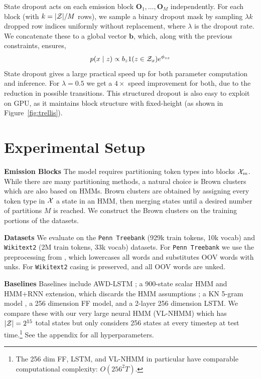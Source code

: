 \documentclass[11pt,a4paper]{article}
\begin{document}
State dropout acts on each emission block $\mathbf{O}_1, \ldots, \mathbf{O}_M$ independently.
For each block (with $k=|{\cal Z}| / M$ rows), we sample a binary dropout mask by sampling
$ \lambda k$ dropped row indices uniformly without replacement,
where $\lambda$ is the dropout rate.
We concatenate these to a global vector $\mathbf{b}$, which, along with the previous constraints, 
ensures,
\begin{equation}
\label{eqn:state_dropout}
p(x \mid z) \propto b_{z}1(z \in \mathcal{Z}_x)e^{\phi_{zx}}
\end{equation}
State dropout gives a large practical speed up for both parameter computation and inference.
For $\lambda=0.5$ we get a $4\times$ speed improvement for both,
due to the reduction in possible transitions.
This structured dropout is also easy to exploit on GPU,
as it maintains block structure with fixed-height (as shown in Figure~\ref{fig:trellis}).


\section{Experimental Setup}
\label{sec:experiments}

\textbf{Emission Blocks}
The model requires partitioning token types into blocks $\mathcal{X}_m$. 
While there are many partitioning methods, a natural choice
is Brown clusters \citep{brown1992,liang2005brown} which are also based on HMMs.
Brown clusters are obtained by assigning every token type in $\mathcal{X}$ a state in an HMM,
then merging states until a desired number of partitions $M$ is reached.
We construct the Brown clusters on the training portions of the datasets.

\noindent \textbf{Datasets}
We evaluate on the \texttt{Penn Treebank} \citep{ptb} (929k train tokens, 10k vocab)
and \texttt{Wikitext2} \citep{wikitext} (2M train tokens, 33k vocab) datasets.
For \texttt{Penn Treebank} we use the preprocessing from \citet{mikolov-2011},
which lowercases all words and substitutes OOV words with unks. 
For \texttt{Wikitext2} casing is preserved, and all OOV words are unked.

\noindent \textbf{Baselines}
Baselines include AWD-LSTM \citep{merity2017awdlstm};
a 900-state scalar HMM and HMM+RNN extension,
which discards the HMM assumptions \citep{buys2018hmm};
a KN 5-gram model \citep{mikolov2012rnn,kenlm},
a 256 dimension FF model,
and a 2-layer 256 dimension LSTM.
We compare these with our very large neural HMM (VL-NHMM)
which has $|\mathcal{Z}|=2^{15}$ total states but only considers 256 states at every timestep at
test time.\footnote{
The 256 dim FF, LSTM, and VL-NHMM in particular
have comparable computational complexity: $O(256^2 T)$.
}
See the appendix for all hyperparameters.
\end{document}
